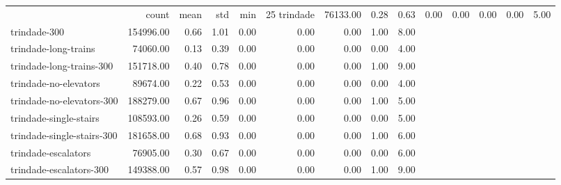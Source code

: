 \begin{tabular}{lrrrrrrrr}
 & count & mean & std & min & 25%
trindade & 76133.00 & 0.28 & 0.63 & 0.00 & 0.00 & 0.00 & 0.00 & 5.00 \\
trindade-300 & 154996.00 & 0.66 & 1.01 & 0.00 & 0.00 & 0.00 & 1.00 & 8.00 \\
trindade-long-trains & 74060.00 & 0.13 & 0.39 & 0.00 & 0.00 & 0.00 & 0.00 & 4.00 \\
trindade-long-trains-300 & 151718.00 & 0.40 & 0.78 & 0.00 & 0.00 & 0.00 & 1.00 & 9.00 \\
trindade-no-elevators & 89674.00 & 0.22 & 0.53 & 0.00 & 0.00 & 0.00 & 0.00 & 4.00 \\
trindade-no-elevators-300 & 188279.00 & 0.67 & 0.96 & 0.00 & 0.00 & 0.00 & 1.00 & 5.00 \\
trindade-single-stairs & 108593.00 & 0.26 & 0.59 & 0.00 & 0.00 & 0.00 & 0.00 & 5.00 \\
trindade-single-stairs-300 & 181658.00 & 0.68 & 0.93 & 0.00 & 0.00 & 0.00 & 1.00 & 6.00 \\
trindade-escalators & 76905.00 & 0.30 & 0.67 & 0.00 & 0.00 & 0.00 & 0.00 & 6.00 \\
trindade-escalators-300 & 149388.00 & 0.57 & 0.98 & 0.00 & 0.00 & 0.00 & 1.00 & 9.00 \\
\end{tabular}
